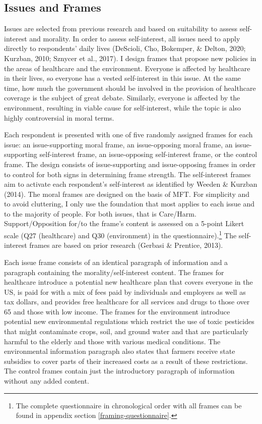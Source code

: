 \documentclass[12pt,econ]{sources/authesis}
\begin{document}
\hypertarget{framing-design-issues-frames}{%
\subsection{Issues and Frames}\label{framing-design-issues-frames}}

Issues are selected from previous research and based on suitability to assess self-interest and morality. In order to assess self-interest, all issues need to apply directly to respondents' daily lives (DeScioli, Cho, Bokemper, \& Delton, 2020; Kurzban, 2010; Sznycer et al., 2017). I design frames that propose new policies in the areas of healthcare and the environment. Everyone is affected by healthcare in their lives, so everyone has a vested self-interest in this issue. At the same time, how much the government should be involved in the provision of healthcare coverage is the subject of great debate. Similarly, everyone is affected by the environment, resulting in viable cause for self-interest, while the topic is also highly controversial in moral terms.

Each respondent is presented with one of five randomly assigned frames for each issue: an issue-supporting moral frame, an issue-opposing moral frame, an issue-supporting self-interest frame, an issue-opposing self-interest frame, or the control frame. The design consists of issue-supporting and issue-opposing frames in order to control for both signs in determining frame strength. The self-interest frames aim to activate each respondent's self-interest as identified by Weeden \& Kurzban (2014). The moral frames are designed on the basis of MFT. For simplicity and to avoid cluttering, I only use the foundation that most applies to each issue and to the majority of people. For both issues, that is Care/Harm. Support/Opposition for/to the frame's content is assessed on a 5-point Likert scale (Q27 (healthcare) and Q30 (environment) in the questionnaire).\footnote{The complete questionnaire in chronological order with all frames can be found in appendix section \ref{framing-questionnaire}.} The self-interest frames are based on prior research (Gerbasi \& Prentice, 2013).

Each issue frame consists of an identical paragraph of information and a paragraph containing the morality/self-interest content. The frames for healthcare introduce a potential new healthcare plan that covers everyone in the US, is paid for with a mix of fees paid by individuals and employers as well as tax dollars, and provides free healthcare for all services and drugs to those over 65 and those with low income. The frames for the environment introduce potential new environmental regulations which restrict the use of toxic pesticides that might contaminate crops, soil, and ground water and that are particularly harmful to the elderly and those with various medical conditions. The environmental information paragraph also states that farmers receive state subsidies to cover parts of their increased costs as a result of these restrictions. The control frames contain just the introductory paragraph of information without any added content.
\end{document}
